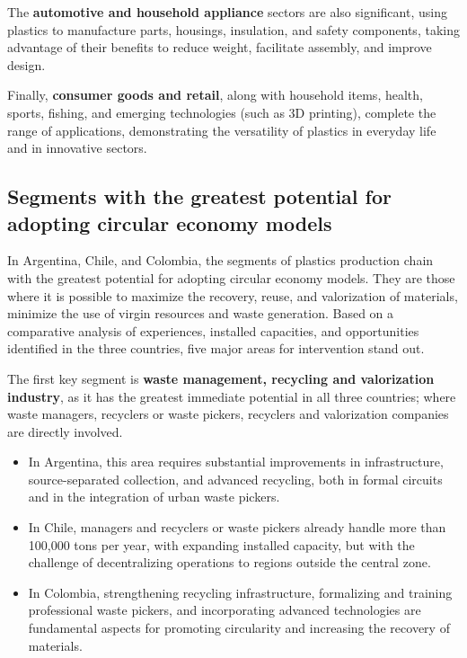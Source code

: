 \documentclass[
  12pt,
  oneside]{book}
\providecommand{\tightlist}{%
  \setlength{\itemsep}{0pt}\setlength{\parskip}{0pt}}
\begin{document}
The \textbf{automotive and household appliance} sectors are also
significant, using plastics to manufacture parts, housings, insulation,
and safety components, taking advantage of their benefits to reduce
weight, facilitate assembly, and improve design.

Finally, \textbf{consumer goods and retail}, along with household items,
health, sports, fishing, and emerging technologies (such as 3D
printing), complete the range of applications, demonstrating the
versatility of plastics in everyday life and in innovative sectors.

\subsection{Segments with the greatest potential for adopting circular
economy
models}\label{segments-with-the-greatest-potential-for-adopting-circular-economy-models}

In Argentina, Chile, and Colombia, the segments of plastics production
chain with the greatest potential for adopting circular economy models.
They are those where it is possible to maximize the recovery, reuse, and
valorization of materials, minimize the use of virgin resources and
waste generation. Based on a comparative analysis of experiences,
installed capacities, and opportunities identified in the three
countries, five major areas for intervention stand out.

The first key segment is \textbf{waste management, recycling and
valorization industry}, as it has the greatest immediate potential in
all three countries; where waste managers, recyclers or waste pickers,
recyclers and valorization companies are directly involved.

\begin{itemize}
\tightlist
\item
  In Argentina, this area requires substantial improvements in
  infrastructure, source-separated collection, and advanced recycling,
  both in formal circuits and in the integration of urban waste pickers.
\item
  In Chile, managers and recyclers or waste pickers already handle more
  than 100,000 tons per year, with expanding installed capacity, but
  with the challenge of decentralizing operations to regions outside the
  central zone.
\item
  In Colombia, strengthening recycling infrastructure, formalizing and
  training professional waste pickers, and incorporating advanced
  technologies are fundamental aspects for promoting circularity and
  increasing the recovery of materials.
\end{itemize}
\end{document}
